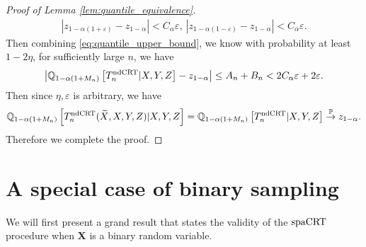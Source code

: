 \documentclass[12pt]{article}
\theoremstyle{definition}
\newcommand{\Q}{\mathbb{Q}}								%
\newcommand{\convp}{\overset{\mathbb{P}}{\rightarrow}}             %
\newcommand{\prx}{\bm X}								%
\newcommand{\srx}{X}									%
\newcommand{\srz}{Z}									%
\newcommand{\srxk}{\widetilde X}						%
\newcommand{\sry}{Y}									%
\newcommand{\ndCRThat}{\textnormal{ndCRT}}	%
\newcommand{\spacrt}{\textnormal{spaCRT}}               %
\begin{document}
\begin{proof}[Proof of Lemma \ref{lem:quantile_equivalence}]
    \begin{align*}
      |z_{1-\alpha(1+\varepsilon)}-z_{1-\alpha}| < C_\alpha\varepsilon,\ |z_{1-\alpha(1-\varepsilon)}-z_{1-\alpha}|< C_\alpha\varepsilon.
    \end{align*}
    Then combining \eqref{eq:quantile_upper_bound}, we know with probability at least $1-2\eta$, for sufficiently large $n$, we have 
    \begin{align*}
      \left|\Q_{1-\alpha(1+M_n)}\left[T_n^{\ndCRThat}|\srx,\sry,\srz\right] - z_{1-\alpha}\right|\leq A_n+B_n< 2C_\alpha\varepsilon + 2\varepsilon.
    \end{align*}
    Then since $\eta,\varepsilon$ is arbitrary, we have
    \begin{align*}
		\Q_{1-\alpha(1+M_n)}\left[T_n^{\ndCRThat}(\srxk,\srx,\sry,\srz)|\srx,\sry,\srz\right]=\Q_{1-\alpha(1+M_n)}\left[T_n^{\ndCRThat}|\srx,\sry,\srz\right]\convp z_{1-\alpha}.
    \end{align*}
    Therefore we complete the proof.
  \end{proof}


  \section{A special case of binary sampling}


We will first present a grand result that states the validity of the $\spacrt$ procedure when $\prx$ is a binary random variable. 
\end{document}
